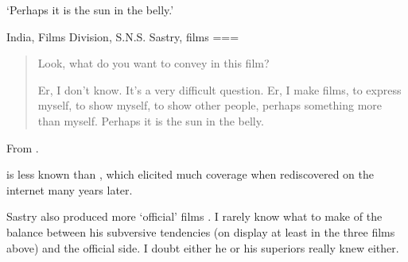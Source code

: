 ‘Perhaps it is the sun in the belly.’

India, Films Division, S.N.S. Sastry, films
===
\begin{quote}
Look, what do you want to convey in this film?

Er, I don’t know. It’s a very difficult question. Er, I make films, to express myself, to show myself, to show other people, perhaps something more than myself. Perhaps it is the sun in the belly.
\end{quote}
From .

 is less known than , which elicited much coverage when rediscovered on the internet many years later.

Sastry also produced more ‘official’ films \parencites*[e.g.][]{sastry1973}{sastry1973a}. I rarely know what to make of the balance between his subversive tendencies (on display at least in the three films above) and the official side. I doubt either he or his superiors really knew either.